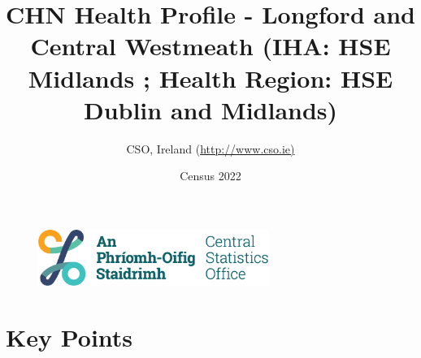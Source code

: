 \documentclass{article}
\title{CHN Health Profile - Longford and Central Westmeath (IHA: HSE Midlands ;  Health Region: HSE Dublin and Midlands) }
\date{Census 2022}
\author{CSO, Ireland  (\url{http://www.cso.ie)}}
\begin{document}


\begin{figure}
	\centering
\includegraphics[width =75mm]{../figures/CSO_Logo.png}
\end{figure}

				 
		   
						  
														  
																																													
												 
			 
\maketitle
					
													   
				 
						 
																																																																											   
				 
				  
  \pagebreak
    	    \tableofcontents

\pagebreak


\section{Key Points}
\end{document}

